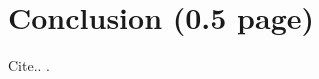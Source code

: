 \documentclass[11pt,letterpaper]{article}
\begin{document}
\section{Conclusion (0.5 page)} 

   Cite.. \cite{Katz:1987}.




\end{document}
